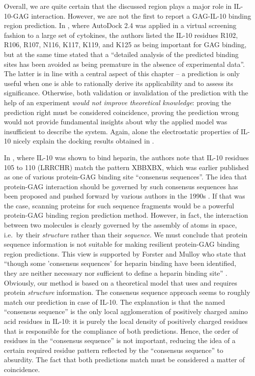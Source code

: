Overall, we are quite certain that the discussed region plays a major role in
IL-10-GAG interaction. However, we are not the first to report a GAG-IL-10
binding region prediction. In \cite{mulloy_forster_2008_4helixcytokines}, where
AutoDock 2.4 \cite{autodock24} was applied in a virtual screening fashion to a
large set of cytokines, the authors listed the IL-10 residues R102, R106, R107,
N116, K117, K119, and K125 as being important for GAG binding, but at the same
time stated that a \enquote{detailed analysis of the predicted binding sites has
been avoided as being premature in the absence of experimental data}. The latter
is in line with a central aspect of this chapter -- a prediction is only useful
when one is able to rationally derive its applicability and to assess its
significance. Otherwise, both validation or invalidation of the prediction with
the help of an experiment \textit{would not improve theoretical knowledge}:
proving the prediction right must be considered coincidence, proving the
prediction wrong would not provide fundamental insights about why the applied
model was insufficient to describe the system. Again, alone the electrostatic
properties of IL-10 nicely explain the docking results obtained in
\cite{mulloy_forster_2008_4helixcytokines}.

In \cite{salek_ardakani_2000}, where IL-10 was shown to bind heparin, the
authors note that IL-10 residues 105 to 110 (LRRCHR) match the pattern XBBXBX,
which was earlier published as one of various protein-GAG binding site
\enquote{consensus sequences}. The idea that protein-GAG interaction should be
governed by such consensus sequences has been proposed and pushed forward by
various authors in the 1990s \cite{mccaffrey_1992,
cardin_weintraub_1989,fromm_1997,caldwell_1996,hileman_1998}. If that was the
case, scanning proteins for such sequence fragments would be a powerful
protein-GAG binding region prediction method. However, in fact, the interaction
between two molecules is clearly governed by the assembly of atoms in space,
i.e.\ by their \textit{structure} rather than their \textit{sequence}. We must
conclude that protein sequence information is not suitable for making resilient
protein-GAG binding region predictions. This view is supported by Forster and
Mulloy who state that \enquote{though some 'consensus sequences' for heparin
binding have been identified, they are neither necessary nor sufficient to
define a heparin binding site} \cite{hp_binding_sites_mulloy_2006}. Obviously,
our method is based on a theoretical model that uses and requires protein
\textit{structure} information. The consensus sequence approach seems to roughly
match our prediction in case of IL-10. The explanation is that the named
\enquote{consensus sequence} is the only local agglomeration of positively
charged amino acid residues in IL-10: it is purely the local density of
positively charged residues that is responsible for the compliance of both
predictions. Hence, the order of residues in the \enquote{consensus sequence} is
not important, reducing the idea of a certain required residue pattern reflected
by the \enquote{consensus sequence} to absurdity. The fact that both predictions
match must be considered a matter of coincidence.

